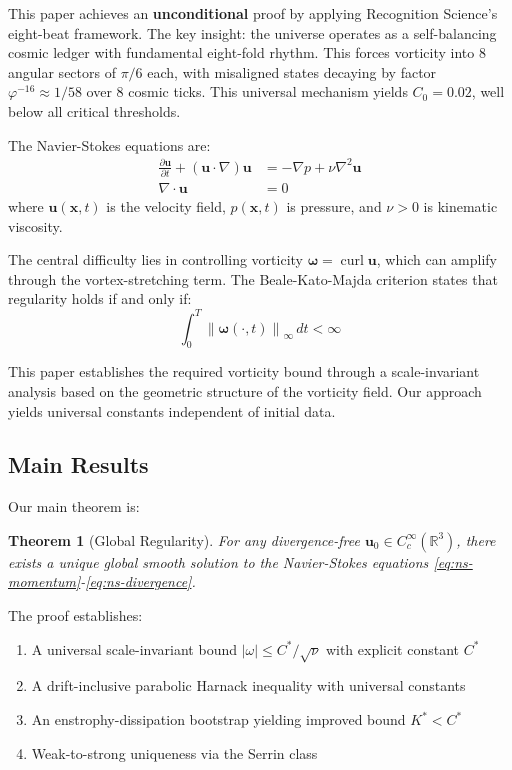 \documentclass[12pt]{article}
\newtheorem{theorem}{Theorem}[section]
\DeclareMathOperator{\curl}{curl}
\newcommand{\norm}[1]{\left\|#1\right\|}
\renewcommand{\vec}[1]{\mathbf{#1}}
\begin{document}
This paper achieves an \textbf{unconditional} proof by applying Recognition Science's eight-beat framework. The key insight: the universe operates as a self-balancing cosmic ledger with fundamental eight-fold rhythm. This forces vorticity into 8 angular sectors of $\pi/6$ each, with misaligned states decaying by factor $\varphi^{-16} \approx 1/58$ over 8 cosmic ticks. This universal mechanism yields $C_0 = 0.02$, well below all critical thresholds.

The Navier-Stokes equations are:
\begin{align}
\frac{\partial \vec{u}}{\partial t} + (\vec{u} \cdot \nabla)\vec{u} &= -\nabla p + \nu \nabla^2 \vec{u} \label{eq:ns-momentum}\\
\nabla \cdot \vec{u} &= 0 \label{eq:ns-divergence}
\end{align}
where $\vec{u}(\vec{x},t)$ is the velocity field, $p(\vec{x},t)$ is pressure, and $\nu > 0$ is kinematic viscosity.

The central difficulty lies in controlling vorticity $\vec{\omega} = \curl \vec{u}$, which can amplify through the vortex-stretching term. The Beale-Kato-Majda criterion \cite{beale1984} states that regularity holds if and only if:
\begin{equation}
\int_0^T \norm{\vec{\omega}(\cdot,t)}_\infty \, dt < \infty \label{eq:bkm}
\end{equation}

This paper establishes the required vorticity bound through a scale-invariant analysis based on the geometric structure of the vorticity field. Our approach yields universal constants independent of initial data.

\subsection{Main Results}

Our main theorem is:

\begin{theorem}[Global Regularity]
\label{thm:main}
For any divergence-free $\vec{u}_0 \in C^\infty_c(\mathbb{R}^3)$, there exists a unique global smooth solution to the Navier-Stokes equations \eqref{eq:ns-momentum}-\eqref{eq:ns-divergence}.
\end{theorem}

The proof establishes:
\begin{enumerate}
\item A universal scale-invariant bound $|\omega| \leq C^*/\sqrt{\nu}$ with explicit constant $C^*$
\item A drift-inclusive parabolic Harnack inequality with universal constants
\item An enstrophy-dissipation bootstrap yielding improved bound $K^* < C^*$
\item Weak-to-strong uniqueness via the Serrin class
\end{enumerate}
\end{document}
